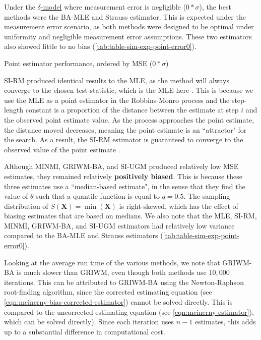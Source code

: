 Under the \hyperref[model: no-measurement-error]{$\delta$-model} where measurement error is negligible ($0*\sigma$), the best methods were the BA-MLE and Strauss estimator. This is expected under the measurement error scenario, as both methods were designed to be optimal under uniformity and negligible measurement error assumptions. These two estimators also showed little to no bias (\autoref{tab:table-sim-exp-point-error0}). 
\begin{table}[ht]
    \centering
    \caption{Point estimator performance, ordered by MSE ($0*\sigma$)}
    
    \label{tab:table-sim-exp-point-error0}
\end{table}

SI-RM produced identical results to the MLE, as the method will always converge to the chosen test-statistic, which is the MLE here \cite{Garthwaite1992}. This is because we use the MLE as a point estimator in the Robbins-Monro process and the step-length constant is a proportion of the distance between the estimate at step $i$ and the observed point estimate value. As the process approaches the point estimate, the distance moved decreases, meaning the point estimate is an ``attractor" for the search. As a result, the SI-RM estimator is guaranteed to converge to the observed value of the point estimate \cite{Garthwaite1992}.

Although MINMI, GRIWM-BA, and SI-UGM produced relatively low MSE estimates, they remained relatively \textbf{positively biased}. This is because these three estimates use a ``median-based estimate", in the sense that they find the value of $\theta$ such that a quantile function is equal to $q = 0.5$. The sampling distribution of $S(\bm{X}) = \min(\bm{X})$ is right-skewed, which has the effect of biasing estimates that are based on medians. We also note that the MLE, SI-RM, MINMI, GRIWM-BA, and SI-UGM estimators had relatively low variance compared to the BA-MLE and Strauss estimators (\autoref{tab:table-sim-exp-point-error0}).

Looking at the average run time of the various methods, we note that GRIWM-BA is much slower than GRIWM, even though both methods use $10,000$ iterations. This can be attributed to GRIWM-BA using the Newton-Raphson root-finding algorithm, since the corrected \citet{Mcinerny2006} estimating equation (see \autoref{eqn:mcinerny-bias-corrected-estimator}) cannot be solved directly. This is compared to the uncorrected estimating equation (see \autoref{eqn:mcinerny-estimator}), which can be solved directly). Since each iteration uses $n-1$ \citet{Mcinerny2006} estimates, this adds up to a substantial difference in computational cost.

